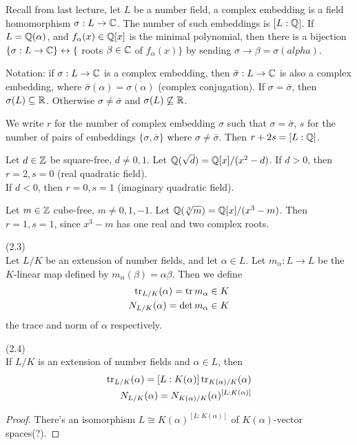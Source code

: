 \documentclass[a4paper]{article}
\begin{document}
Recall from last lecture, let $L$ be a number field, a complex embedding is a field homomorphism $\sigma:L \to \mathbb{C}$. The number of such embeddings is $[L:\mathbb{Q}$]. If $L = \mathbb{Q}(\alpha)$, and $f_\alpha(x) \in \mathbb{Q}[x]$ is the minimal polynomial, then there is a bijection $\{\sigma:L \to \mathbb{C} \} \leftrightarrow \{$ roots $\beta \in \mathbb{C}$ of $f_\alpha(x)\}$ by sending $\sigma \to \beta = \sigma(alpha)$.

Notation: if $\sigma:L \to \mathbb{C}$ is a complex embedding, then $\bar{\sigma} : L \to \mathbb{C}$ is also a complex embedding, where $\bar{\sigma}(\alpha) = \overline{\sigma(\alpha)}$ (complex conjugation). If $\sigma = \bar{\sigma}$, then $\sigma(L) \subseteq \mathbb{R}$. Otherwise $\sigma \neq \bar{\sigma}$ and $\sigma(L) \not\subseteq \mathbb{R}$.

We write $r$ for the number of complex embedding $\sigma$ such that $\sigma = \bar{\sigma}$, $s$ for the number of pairs of embeddings $\{\sigma,\bar{\sigma}\}$ where $\sigma \neq \bar{\sigma}$. Then $r+2s = [L:\mathbb{Q}]$.

\begin{eg}
Let $d \in \mathbb{Z}$ be square-free, $d \neq 0,1$. Let $\mathbb{Q}(\sqrt{d}) = \mathbb{Q}[x] / (x^2-d)$. If $d>0$, then $r=2,s=0$ (real quadratic field).\\
If $d<0$, then $r=0,s=1$ (imaginary quadratic field).
\end{eg}

\begin{eg}
Let $m \in \mathbb{Z}$ cube-free, $m \neq 0,1,-1$. Let $\mathbb{Q}(\sqrt[3]{m}) =\mathbb{Q}[x]/(x^3-m)$. Then $r=1,s=1$, since $x^3-m$ has one real and two complex roots.
\end{eg}

\begin{defi} (2.3)\\
Let $L/K$ be an extension of number fields, and let $\alpha \in L$. Let $m_\alpha:L\to L$ be the $K$-linear map defined by $m_\alpha(\beta) = \alpha\beta$. Then we define
\begin{equation*}
\begin{aligned}
\operatorname{tr}_{L/K}(\alpha) = \operatorname{tr} m_\alpha \in K\\
N_{L/K}(\alpha) = \det m_\alpha \in K
\end{aligned}
\end{equation*}
the trace and norm of $\alpha$ respectively.
\end{defi}

\begin{lemma} (2.4)\\
If $L/K$ is an extension of number fields and $\alpha \in L$, then 
\begin{equation*}
\begin{aligned}
\operatorname{tr}_{L/K}(\alpha) = [L:K(\alpha)] \operatorname{tr}_{K(\alpha)/K}(\alpha)\\
N_{L/K}(\alpha) = N_{K(\alpha)/K} (\alpha)^{[L:K(\alpha)]}
\end{aligned}
\end{equation*}
\begin{proof}
There's an isomorphism $L \cong K(\alpha)^{[L:K(\alpha)]}$ of $K(\alpha)$-vector spaces(?).
\end{proof}
\end{lemma}
\end{document}
